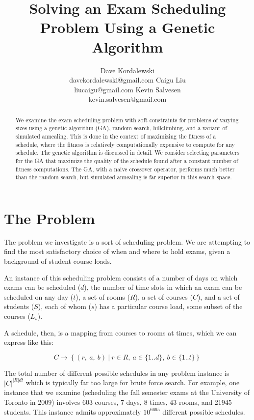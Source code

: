 \documentclass[letterpaper]{article}
\title{Solving an Exam Scheduling Problem Using a Genetic Algorithm}
\author{Dave Kordalewski \\ davekordalewski@gmail.com
   \And Caigu Liu \\liucaigu@gmail.com
   \And Kevin Salvesen \\ kevin.salvesen@gmail.com}
\begin{document}
\maketitle

\begin{abstract}
  We examine the exam scheduling problem with soft constraints for problems of varying
  sizes using a genetic algorithm (GA), random search, hillclimbing, and a variant of simulated
  annealing. This is done in the context of maximizing the fitness of a schedule, where the
  fitness is relatively computationally expensive to compute for any schedule. The genetic
  algorithm is discussed in detail. We consider selecting parameters for the GA that
  maximize the quality of the schedule found after a constant number of fitness computations. 
  The GA, with a naive crossover operator, performs much better than the random search, but
  simulated annealing is far superior in this search space.
\end{abstract}

\section{The Problem}
  The problem we investigate is a sort of scheduling problem. 
  We are attempting to find the most satisfactory choice of when
  and where to hold exams, given a background of student course loads. 

  An instance of this scheduling problem consists of a number of days
  on which exams can be scheduled ($d$), the number of time slots in which
  an exam can be scheduled on any day ($t$), a set of rooms ($R$), a set of
  courses ($C$), and a set of students ($S$), each of whom ($s$) has a
  particular course load, some subset of the courses ($L_s$).

  A schedule, then, is a mapping from courses to rooms at times, 
  which we can express like this:
  
  \[ C \rightarrow \left\{(r,\ a,\ b)\ |\ r\in R,\ a\in \{1..d\},\ b\in \{1..t\}\right\} \]
  
  The total number of different possible schedules in any problem instance is
  $|C|^{|R|dt}$ which is typically far too large for brute force search.
  For example, one instance that we examine (scheduling the fall semester
  exams at the University of Toronto in 2009) involves 603 courses, 7 days,
  8 times, 43 rooms, and 21945 students. This instance admits approximately 
  $10^{6695}$ different possible schedules.
\end{document}

